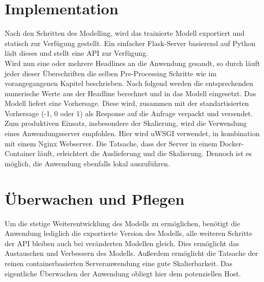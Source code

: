 \section{Implementation}
Nach den Schritten des Modelling, wird das trainierte Modell exportiert und statisch zur Verfügung gestellt.
Ein einfacher Flask-Server basierend auf Python lädt dieses und stellt eine API zur Verfügung.\\
Wird nun eine oder mehrere Headlines an die Anwendung gesandt, so durch läuft jeder dieser Überschriften die selben Pre-Processing Schritte wie im vorangegangenen Kapitel beschrieben. Nach folgend werden die entsprechenden numerische Werte aus der Headline berechnet und in das Modell eingesetzt. Das Modell liefert eine Vorhersage. Diese wird, zusammen mit der standartisierten Vorhersage (-1, 0 oder 1) als Response auf die Anfrage verpackt und versendet. \\
Zum produktiven Einsatz, insbesondere der Skalierung, wird die Verwendung eines Anwendungsserver empfohlen. Hier wird uWSGI verwendet, in kombination mit einem Nginx Webserver. Die Tatsache, dass der Server in einem Docker-Container läuft, erleichtert die Auslieferung und die Skalierung. Dennoch ist es möglich, die Anwendung ebenfalls lokal auszuführen. 

\section{Überwachen und Pflegen}
Um die stetige Weiterentwicklung des Modells zu ermöglichen, benötigt die Anwendung lediglich die exportierte Version des Modells, alle weiteren Schritte der API bleiben auch bei veränderten Modellen gleich. Dies ermöglicht das Austauschen und Verbessern des Modells. Außerdem ermöglicht die Tatsache der reinen containerbasierten Serveranwendung eine gute Skalierbarkeit. Das eigentliche Überwachen der Anwendung obliegt hier dem potenziellen Host.